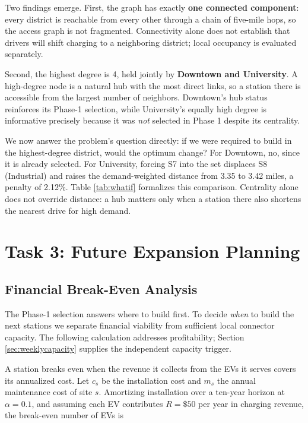 \documentclass[12pt]{article}
\begin{document}
Two findings emerge. First, the graph has exactly \textbf{one connected component}: every
district is reachable from every other through a chain of five-mile hops, so the access graph
is not fragmented. Connectivity alone does not establish that drivers will shift charging
to a neighboring district; local occupancy is evaluated separately.

Second, the highest degree is 4, held jointly by \textbf{Downtown and University}. A
high-degree node is a natural hub with the most direct links, so a station there is
accessible from the largest number of neighbors. Downtown's hub status reinforces its
Phase-1 selection, while University's equally high degree is informative precisely because
it was \emph{not} selected in Phase 1 despite its centrality.

We now answer the problem's question directly: if we were required to build in the
highest-degree district, would the optimum change? For Downtown, no, since it is already
selected. For University, forcing S7 into the set displaces S8 (Industrial) and raises the
demand-weighted distance from 3.35 to 3.42 miles, a penalty of 2.12\%. Table
\ref{tab:whatif} formalizes this comparison. Centrality alone does not override distance: a
hub matters only when a station there also shortens the nearest drive for high demand.

\section{Task 3: Future Expansion Planning}
\label{sec:expansion}

\subsection{Financial Break-Even Analysis}
\label{subsec:break-even}

The Phase-1 selection answers where to build first. To decide \emph{when} to build the next
stations we separate financial viability from sufficient local connector capacity.
The following calculation addresses profitability; Section \ref{sec:weeklycapacity}
supplies the independent capacity trigger.

A station breaks even when the revenue it collects from the EVs it serves covers its
annualized cost. Let $c_s$ be the installation cost and $m_s$ the annual maintenance cost
of site $s$. Amortizing installation over a ten-year horizon at $\alpha=0.1$, and assuming
each EV contributes $R=\$50$ per year in charging revenue, the break-even number of EVs is
\end{document}

